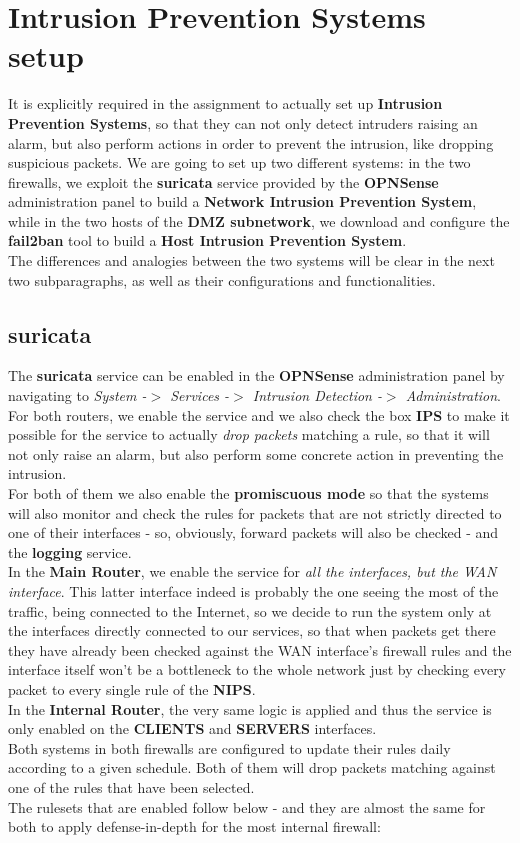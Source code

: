 \section{Intrusion Prevention Systems setup}
It is explicitly required in the assignment to actually set up \textbf{Intrusion Prevention Systems}, so that they can not only detect intruders raising an alarm, but also perform actions in order to prevent the intrusion, like dropping suspicious packets. We are going to set up two different systems: in the two firewalls, we exploit the \textbf{suricata} service provided by the \textbf{OPNSense} administration panel to build a \textbf{Network Intrusion Prevention System}, while in the two hosts of the \textbf{DMZ subnetwork}, we download and configure the \textbf{fail2ban} tool to build a \textbf{Host Intrusion Prevention System}.\\
The differences and analogies between the two systems will be clear in the next two subparagraphs, as well as their configurations and functionalities.\\

\subsection{suricata}
The \textbf{suricata} service can be enabled in the \textbf{OPNSense} administration panel by navigating to \textit{System -$>$ Services -$>$ Intrusion Detection -$>$ Administration}. For both routers, we enable the service and we also check the box \textbf{IPS} to make it possible for the service to actually \textit{drop packets} matching a rule, so that it will not only raise an alarm, but also perform some concrete action in preventing the intrusion.\\
For both of them we also enable the \textbf{promiscuous mode} so that the systems will also monitor and check the rules for packets that are not strictly directed to one of their interfaces - so, obviously, forward packets will also be checked - and the \textbf{logging} service.\\
In the \textbf{Main Router}, we enable the service for \textit{all the interfaces, but the WAN interface}. This latter interface indeed is probably the one seeing the most of the traffic, being connected to the Internet, so we decide to run the system only at the interfaces directly connected to our services, so that when packets get there they have already been checked against the WAN interface's firewall rules and the interface itself won't be a bottleneck to the whole network just by checking every packet to every single rule of the \textbf{NIPS}.\\
In the \textbf{Internal Router}, the very same logic is applied and thus the service is only enabled on the \textbf{CLIENTS} and \textbf{SERVERS} interfaces.\\
Both systems in both firewalls are configured to update their rules daily according to a given schedule. Both of them will drop packets matching against one of the rules that have been selected.\\
The rulesets that are enabled follow below - and they are almost the same for both to apply defense-in-depth for the most internal firewall:\\

